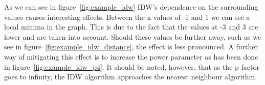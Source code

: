             As we can see in figure~\ref{fig:example_idw} IDW's dependence on the surrounding values causes interesting effects. Between the x values of -1 and 1 we can see a local minima in the graph. This is due to the fact that the values at -3 and 3 are lower and are taken into account. Should these values be further away, such as we see in figure~\ref{fig:example_idw_distance}, the effect is less pronounced. A further way of mitigating this effect is to increase the power parameter as has been done in figure~\ref{fig:example_idw_p4}. It should be noted, however, that as the p factor goes to infinity, the IDW algorithm approaches the nearest neighbour algorithm. 

